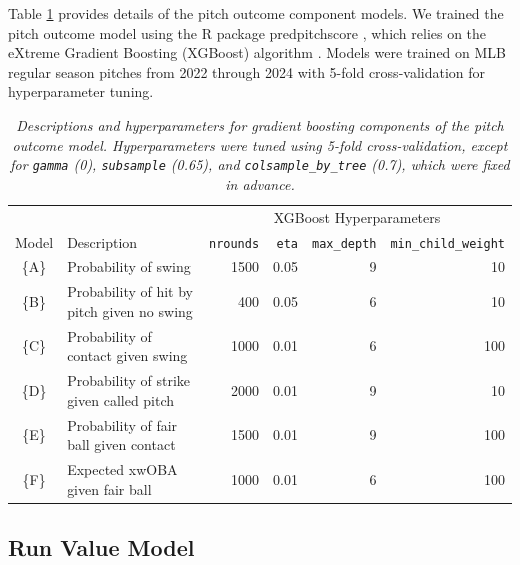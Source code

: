\documentclass{article}
\begin{document}
      Table \ref{tab:pitch-outcome-model} provides details of the pitch outcome component models. We trained the pitch outcome model using the R package predpitchscore \citep{powers_predpitchscore_2025}, which relies on the eXtreme Gradient Boosting (XGBoost) algorithm \citep{chen_xgboost_2016}. Models were trained on MLB regular season pitches from 2022 through 2024 with 5-fold cross-validation for hyperparameter tuning.

      \begin{table}[H]
        \begin{tabular}{cl|rrrr}
                &                                             & \multicolumn{4}{c}{XGBoost Hyperparameters}\\
          Model & Description                                 & \texttt{nrounds}  & \texttt{eta}  & \texttt{max\_depth}  & \texttt{min\_child\_weight}\\
          \hline
          \{A\} & Probability of swing                        & 1500              & 0.05          & 9                   & 10\\
          \{B\} & Probability of hit by pitch given no swing  &  400              & 0.05          & 6                   & 10\\
          \{C\} & Probability of contact given swing          & 1000              & 0.01          & 6                   & 100\\
          \{D\} & Probability of strike given called pitch    & 2000              & 0.01          & 9                   & 10\\
          \{E\} & Probability of fair ball given contact      & 1500              & 0.01          & 9                   & 100\\
          \{F\} & Expected xwOBA given fair ball              & 1000              & 0.01          & 6                   & 100\\
        \end{tabular}
        \caption{\it Descriptions and hyperparameters for gradient boosting components of the pitch outcome model. Hyperparameters were tuned using 5-fold cross-validation, except for \texttt{gamma} (0), \texttt{subsample} (0.65), and \texttt{colsample\_by\_tree} (0.7), which were fixed in advance.}
        \label{tab:pitch-outcome-model}
      \end{table}

    \subsection{Run Value Model}
    \label{sec:methods-value}
\end{document}
